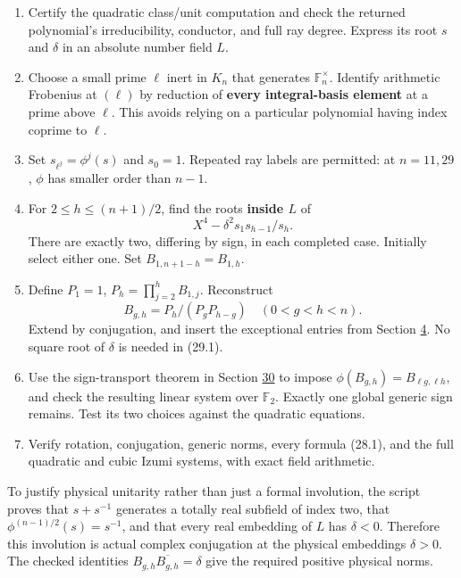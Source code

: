 \documentclass[11pt,reqno]{amsart}
\theoremstyle{plain}
\begin{document}
\begin{enumerate}
\item Certify the quadratic class/unit computation and check the returned
polynomial's irreducibility, conductor, and full ray degree. Express
its root \(s\) and \(\delta\) in an absolute number field \(L\).
\item Choose a small prime \(\ell\) inert in \(K_n\) that generates
\(\mathbb F_n^\times\). Identify arithmetic Frobenius at \((\ell)\)
by reduction of \textbf{every integral-basis element} at a prime above
\(\ell\). This avoids relying on a particular polynomial having
index coprime to \(\ell\).
\item Set \(s_{\ell^j}=\phi^j(s)\) and \(s_0=1\). Repeated ray labels are
permitted: at \(n=11,29\), \(\phi\) has smaller order than \(n-1\).
\item For \(2\le h\le(n+1)/2\), find the roots \textbf{inside \(L\)} of
\[
  X^4-\delta^2s_1s_{h-1}/s_h.
\]
There are exactly two, differing by sign, in each completed case.
Initially select either one. Set \(B_{1,n+1-h}=B_{1,h}\).
\item Define \(P_1=1\), \(P_h=\prod_{j=2}^hB_{1,j}\). Reconstruct
\begin{equation*}
  \boxed{B_{g,h}=P_h/(P_gP_{h-g})\quad(0<g<h<n).}
  \tag{29.1}
\end{equation*}
Extend by conjugation, and insert the exceptional entries from
Section \hyperref[sec:4]{4}. No square root of \(\delta\) is needed in (29.1).
\item Use the sign-transport theorem in Section \hyperref[sec:30]{30} to impose
\(\phi(B_{g,h})=B_{\ell g,\ell h}\), and check the resulting
linear system over \(\mathbb F_2\). Exactly one global generic
sign remains. Test its two choices against the quadratic equations.
\item Verify rotation, conjugation, generic norms, every formula (28.1),
and the full quadratic and cubic Izumi systems, with exact field
arithmetic.
\end{enumerate}

To justify physical unitarity rather than just a formal involution,
the script proves that \(s+s^{-1}\) generates a totally real subfield
of index two, that \(\phi^{(n-1)/2}(s)=s^{-1}\), and that every real
embedding of \(L\) has \(\delta<0\). Therefore this involution is actual
complex conjugation at the physical embeddings \(\delta>0\).
The checked identities \(B_{g,h}\overline{B_{g,h}}=\delta\) give the
required positive physical norms.
\end{document}
